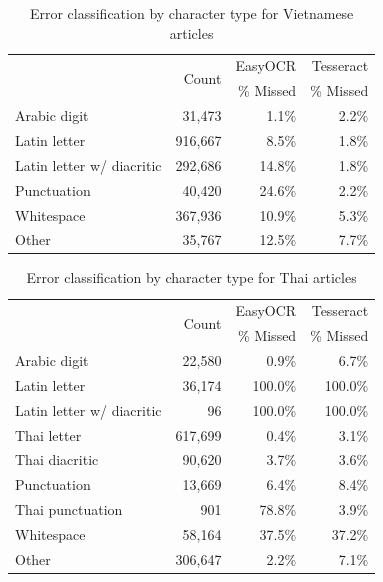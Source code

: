 \documentclass[12pt,oneside]{memoir}
\begin{document}
\begin{table}[ht]
    \caption{Error classification by character type for Vietnamese articles}
    \label{table:vietnamese-error-classification}
    \centering
    \begin{tabular}{lrrr}
        \toprule
        & \multirow{2}{*}{Count} & EasyOCR & Tesseract\\
        & & \% Missed & \% Missed\\
        \midrule
        Arabic digit & 31,473 & 1.1\% & 2.2\%\\
        Latin letter & 916,667 & 8.5\% & 1.8\%\\
        Latin letter w/ diacritic & 292,686 & 14.8\% & 1.8\%\\
        Punctuation & 40,420 & 24.6\% & 2.2\%\\
        Whitespace & 367,936 & 10.9\% & 5.3\%\\
        Other & 35,767 & 12.5\% & 7.7\%\\
        \bottomrule
    \end{tabular}
\end{table}

\begin{table}[ht]
    \caption{Error classification by character type for Thai articles}
    \label{table:thai-error-classification}
    \centering
    \begin{tabular}{lrrr}
        \toprule
        & \multirow{2}{*}{Count} & EasyOCR & Tesseract\\
        & & \% Missed & \% Missed\\
        \midrule
        Arabic digit & 22,580 & 0.9\% & 6.7\%\\
        Latin letter & 36,174 & 100.0\% & 100.0\%\\
        Latin letter w/ diacritic & 96 & 100.0\% & 100.0\%\\
        Thai letter & 617,699 & 0.4\% & 3.1\%\\
        Thai diacritic & 90,620 & 3.7\% & 3.6\%\\
        Punctuation & 13,669 & 6.4\% & 8.4\%\\
        Thai punctuation & 901 & 78.8\% & 3.9\%\\
        Whitespace & 58,164 & 37.5\% & 37.2\%\\
        Other & 306,647 & 2.2\% & 7.1\%\\
        \bottomrule
    \end{tabular}
\end{table}
\end{document}

